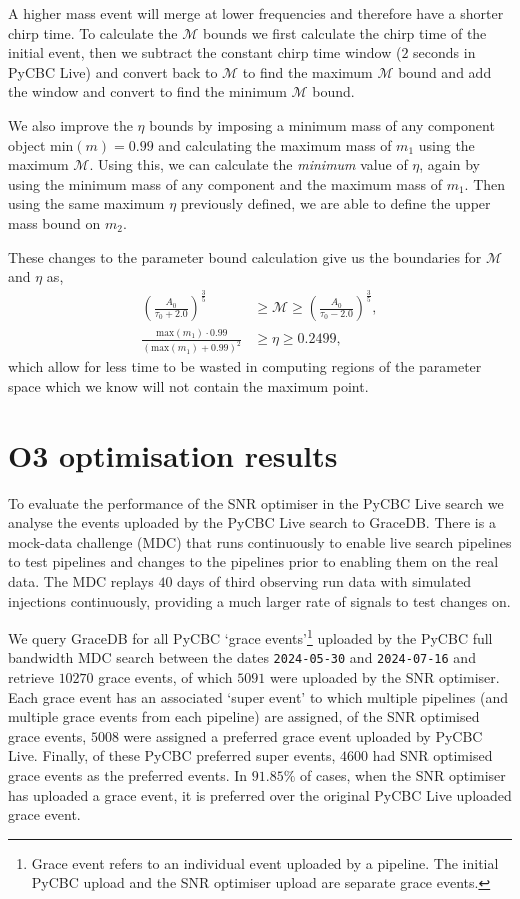 A higher mass \gwadj event will merge at lower frequencies and therefore have a shorter chirp time. To calculate the $\mathcal{M}$ bounds we first calculate the chirp time of the initial event, then we subtract the constant chirp time window ($2$ seconds in PyCBC Live) and convert back to $\mathcal{M}$ to find the maximum $\mathcal{M}$ bound and add the window and convert to find the minimum $\mathcal{M}$ bound.

We also improve the $\eta$ bounds by imposing a minimum mass of any component object $\text{min}(m) = 0.99$ and calculating the maximum mass of $m_{1}$ using the maximum $\mathcal{M}$. Using this, we can calculate the \textit{minimum} value of $\eta$, again by using the minimum mass of any component and the maximum mass of $m_{1}$. Then using the same maximum $\eta$ previously defined, we are able to define the upper mass bound on $m_{2}$.

These changes to the parameter bound calculation give us the boundaries for $\mathcal{M}$ and $\eta$ as,
%
\begin{align}
    \left(\frac{A_{0}}{\tau_{0} + 2.0}\right)^{\frac{3}{5}} &\ge \mathcal{M} \ge \left(\frac{A_{0}}{\tau_{0} - 2.0}\right)^{\frac{3}{5}}, \\[10pt]
    \frac{\text{max}(m_{1}) \cdot 0.99}{(\text{max}(m_{1}) + 0.99)^{2}} &\ge \eta \ge 0.2499,
\end{align}
%
which allow for less time to be wasted in computing regions of the parameter space which we know will not contain the maximum point.

\section{\label{7:sec:results}O3 optimisation results}

To evaluate the performance of the SNR optimiser in the PyCBC Live search we analyse the events uploaded by the PyCBC Live search to GraceDB. There is a \gwadj mock-data challenge (MDC) that runs continuously to enable live search pipelines to test pipelines and changes to the pipelines prior to enabling them on the real \gwadj data. The MDC replays $40$ days of third observing run \gwadj data with simulated injections continuously, providing a much larger rate of signals to test changes on.

We query GraceDB for all PyCBC `grace events'\footnote{Grace event refers to an individual event uploaded by a pipeline. The initial PyCBC upload and the SNR optimiser upload are separate grace events.} uploaded by the PyCBC full bandwidth MDC search between the dates \texttt{2024-05-30} and \texttt{2024-07-16} and retrieve $10270$ grace events, of which $5091$ were uploaded by the SNR optimiser. Each grace event has an associated `super event' to which multiple pipelines (and multiple grace events from each pipeline) are assigned, of the SNR optimised grace events, $5008$ were assigned a preferred grace event uploaded by PyCBC Live. Finally, of these PyCBC preferred super events, $4600$ had SNR optimised grace events as the preferred events. In $91.85\%$ of cases, when the SNR optimiser has uploaded a grace event, it is preferred over the original PyCBC Live uploaded grace event.

